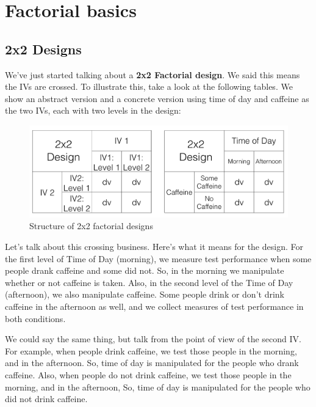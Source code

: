 \documentclass[
]{book}
\begin{document}
\hypertarget{factorial-basics}{%
\section{Factorial basics}\label{factorial-basics}}

\hypertarget{x2-designs}{%
\subsection{2x2 Designs}\label{x2-designs}}

We've just started talking about a \textbf{2x2 Factorial design}. We said this means the IVs are crossed. To illustrate this, take a look at the following tables. We show an abstract version and a concrete version using time of day and caffeine as the two IVs, each with two levels in the design:

\begin{figure}
\centering
\includegraphics{figures/2x2Design.png}
\caption{\label{fig:9designs}Structure of 2x2 factorial designs}
\end{figure}

Let's talk about this crossing business. Here's what it means for the design. For the first level of Time of Day (morning), we measure test performance when some people drank caffeine and some did not. So, in the morning we manipulate whether or not caffeine is taken. Also, in the second level of the Time of Day (afternoon), we also manipulate caffeine. Some people drink or don't drink caffeine in the afternoon as well, and we collect measures of test performance in both conditions.

We could say the same thing, but talk from the point of view of the second IV. For example, when people drink caffeine, we test those people in the morning, and in the afternoon. So, time of day is manipulated for the people who drank caffeine. Also, when people do not drink caffeine, we test those people in the morning, and in the afternoon, So, time of day is manipulated for the people who did not drink caffeine.
\end{document}
